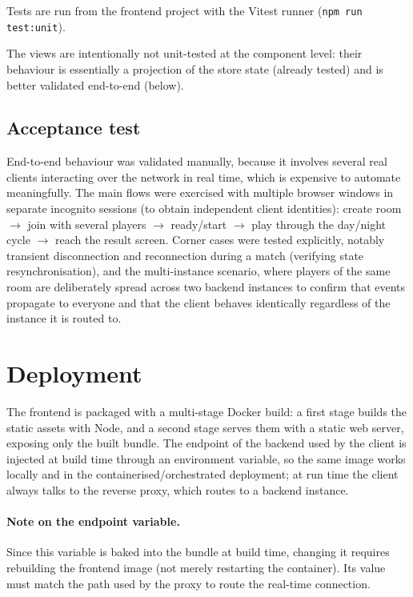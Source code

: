 \documentclass{scrartcl}
\begin{document}
Tests are run from the frontend project with the Vitest runner
(\texttt{npm run test:unit}).

The views are intentionally not unit-tested at the component level:
their behaviour is essentially a projection of the store state (already
tested) and is better validated end-to-end (below).

\subsection{Acceptance test}\label{acceptance-test}

End-to-end behaviour was validated manually, because it involves several
real clients interacting over the network in real time, which is
expensive to automate meaningfully. The main flows were exercised with
multiple browser windows in separate incognito sessions (to obtain
independent client identities): create room $\to$ join with several
players $\to$ ready/start $\to$ play through the day/night cycle $\to$
reach the result screen. Corner cases were tested explicitly, notably
transient disconnection and reconnection during a match (verifying state
resynchronisation), and the multi-instance scenario, where players of
the same room are deliberately spread across two backend instances to
confirm that events propagate to everyone and that the client behaves
identically regardless of the instance it is routed to.

\section{Deployment}\label{deployment}

The frontend is packaged with a multi-stage Docker build: a first stage
builds the static assets with Node, and a second stage serves them with
a static web server, exposing only the built bundle. The endpoint of the
backend used by the client is injected at build time through an
environment variable, so the same image works locally and in the
containerised/orchestrated deployment; at run time the client always
talks to the reverse proxy, which routes to a backend instance.

\paragraph{Note on the endpoint variable.} Since this variable is baked
into the bundle at build time, changing it requires rebuilding the
frontend image (not merely restarting the container). Its value must
match the path used by the proxy to route the real-time connection.
\end{document}
